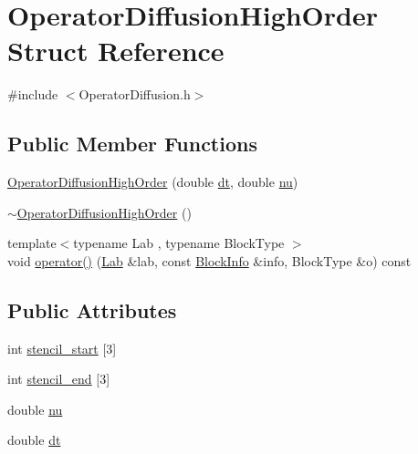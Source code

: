 \hypertarget{struct_operator_diffusion_high_order}{}\section{Operator\+Diffusion\+High\+Order Struct Reference}
\label{struct_operator_diffusion_high_order}


{\ttfamily \#include $<$Operator\+Diffusion.\+h$>$}

\subsection*{Public Member Functions}
\begin{DoxyCompactItemize}
\item 
\hyperlink{struct_operator_diffusion_high_order_a086a3d39e9059f2b480b5919b0ed86dc}{Operator\+Diffusion\+High\+Order} (double \hyperlink{struct_operator_diffusion_high_order_a6d99bc04db2cd5cbaa3ad688b6f6ffdd}{dt}, double \hyperlink{struct_operator_diffusion_high_order_a4edb2ba76222b135992607ff39af1867}{nu})
\item 
\hyperlink{struct_operator_diffusion_high_order_a33d1f96c66825ec4265e4eacd6759f06}{$\sim$\+Operator\+Diffusion\+High\+Order} ()
\item 
{\footnotesize template$<$typename Lab , typename Block\+Type $>$ }\\void \hyperlink{struct_operator_diffusion_high_order_a27d274d97e6dffaf9babb2822f7eeb35}{operator()} (\hyperlink{_definitions_8h_ad6f951af9a2a6ebc1975404882b34314}{Lab} \&lab, const \hyperlink{struct_block_info}{Block\+Info} \&info, Block\+Type \&o) const 
\end{DoxyCompactItemize}
\subsection*{Public Attributes}
\begin{DoxyCompactItemize}
\item 
int \hyperlink{struct_operator_diffusion_high_order_a24900868ca9406abe8e5c1354c4491b9}{stencil\+\_\+start} \mbox{[}3\mbox{]}
\item 
int \hyperlink{struct_operator_diffusion_high_order_a44ac0191d8a74bdf1992715d0fc8b859}{stencil\+\_\+end} \mbox{[}3\mbox{]}
\item 
double \hyperlink{struct_operator_diffusion_high_order_a4edb2ba76222b135992607ff39af1867}{nu}
\item 
double \hyperlink{struct_operator_diffusion_high_order_a6d99bc04db2cd5cbaa3ad688b6f6ffdd}{dt}
\end{DoxyCompactItemize}


